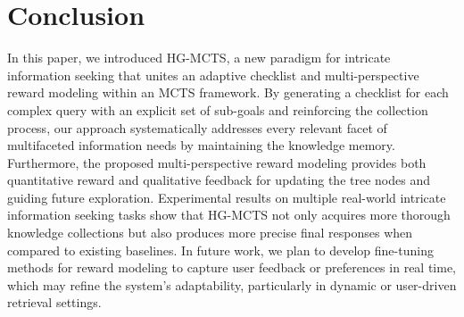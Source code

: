 \section{Conclusion}
In this paper, we introduced HG-MCTS, a new paradigm for intricate information seeking that unites an adaptive checklist and multi-perspective reward modeling within an MCTS framework. By generating a checklist for each complex query with an explicit set of sub-goals and reinforcing the collection process, our approach systematically addresses every relevant facet of multifaceted information needs by maintaining the knowledge memory. Furthermore, the proposed multi-perspective reward modeling provides both quantitative reward and qualitative feedback for updating the tree nodes and guiding future exploration. Experimental results on multiple real-world intricate information seeking tasks show that HG-MCTS not only acquires more thorough knowledge collections but also produces more precise final responses when compared to existing baselines. 
In future work, we plan to develop fine-tuning methods for reward modeling to capture user feedback or preferences in real time, which may refine the system’s adaptability, particularly in dynamic or user-driven retrieval settings.